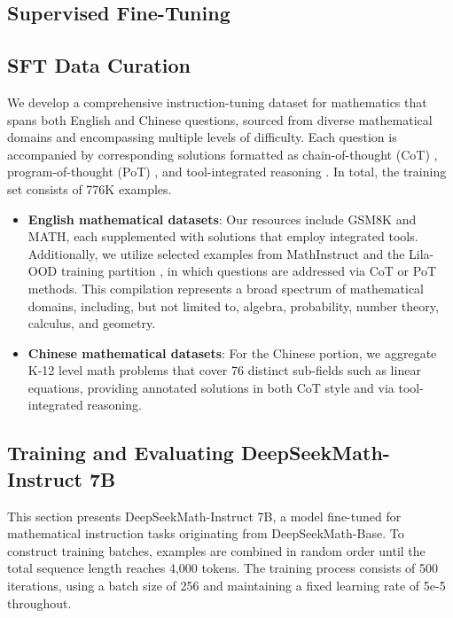 \begin{itemize}[topsep=0pt]
\section{Supervised Fine-Tuning}

\subsection{SFT Data Curation}

We develop a comprehensive instruction-tuning dataset for mathematics that spans both English and Chinese questions, sourced from diverse mathematical domains and encompassing multiple levels of difficulty. Each question is accompanied by corresponding solutions formatted as chain-of-thought (CoT) \citep{cot}, program-of-thought (PoT) \citep{pot,pal}, and tool-integrated reasoning \citep{tora}. In total, the training set consists of 776K examples.

\begin{itemize}[topsep=0pt]
    \item \textbf{English mathematical datasets}: Our resources include GSM8K and MATH, each supplemented with solutions that employ integrated tools. Additionally, we utilize selected examples from MathInstruct \citep{MathInstruct} and the Lila-OOD training partition \citep{lila}, in which questions are addressed via CoT or PoT methods. This compilation represents a broad spectrum of mathematical domains, including, but not limited to, algebra, probability, number theory, calculus, and geometry.
    \item \textbf{Chinese mathematical datasets}: For the Chinese portion, we aggregate K-12 level math problems that cover 76 distinct sub-fields such as linear equations, providing annotated solutions in both CoT style and via tool-integrated reasoning.
\end{itemize}

\subsection{Training and Evaluating DeepSeekMath-Instruct 7B}

This section presents DeepSeekMath-Instruct 7B, a model fine-tuned for mathematical instruction tasks originating from DeepSeekMath-Base. To construct training batches, examples are combined in random order until the total sequence length reaches 4,000 tokens. The training process consists of 500 iterations, using a batch size of 256 and maintaining a fixed learning rate of 5e-5 throughout.


\end{itemize}
